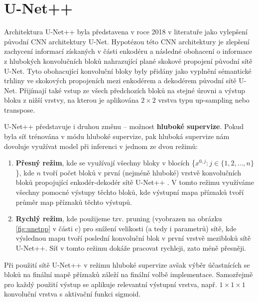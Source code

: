 \section{U-Net++}
\label{sec:Chapter23}

Architektura U-Net++ byla představena v roce 2018 v literatuře \cite{unetpp} jako vylepšení původní CNN architektury U-Net. Hypotézou této CNN architektury je zlepšení zachycení informací získaných v části enkodéru a následné obohacení o informace z hlubokých konvolučních bloků nahrazující plané skokové propojení původní sítě U-Net. Tyto obohacující konvoluční bloky byly přidány jako vyplnění sémantické trhliny ve skokových propojeních mezi enkodérem a dekodérem původní sítě U-Net. Přijímají také vstup ze všech předchozích bloků na stejné úrovni a výstup bloku z nižší vrstvy, na kterou je aplikována $2\times2$ vrstva typu up-sampling nebo transpose. 

U-Net++ představuje i druhou změnu -- možnost \textbf{hluboké supervize}. Pokud byla síť trénována v módu hluboké supervize, pak hluboká supervize nám dovoluje využívat model při inferenci v jednom ze dvou režimů:

\begin{enumerate}
    \item \textbf{Přesný režim}, kde se využívají všechny bloky v blocích \{\(x^{0, j} \colon j \in \{1,2,...,n\}\)\}, kde \(n\) tvoří počet bloků v první (nejméně hluboké) vrstvě konvolučních bloků propojující enkodér-dekodér sítě U-Net++ \cite{unetpp}. V tomto režimu využíváme všechny pomocné výstupy těchto bloků, kde výstupní mapa příznaků tvoří průměr map příznaků těchto výstupů.
    \item \textbf{Rychlý režim}, kde použijeme tzv. pruning (vyobrazen na obrázku \ref{fig:unetpp} v části c) pro snížení velikosti (a tedy i parametrů) sítě, kde výslednou mapu tvoří poslední konvoluční blok v první vrstvě mezibloků sítě U-Net++. Síť v tomto režimu dokáže pracovat rychleji, zato méně přesněji.
\end{enumerate}

Při použití sítě U-Net++ v režimu hluboké supervize avšak výběr účastnících se bloků na finální mapě příznaků záleží na finální volbě implementace. Samozřejmě pro každý použití výstup se aplikuje relevantní výstupní vrstva, např. $1\times1\times1$ konvoluční vrstva s aktivační funkci sigmoid.

